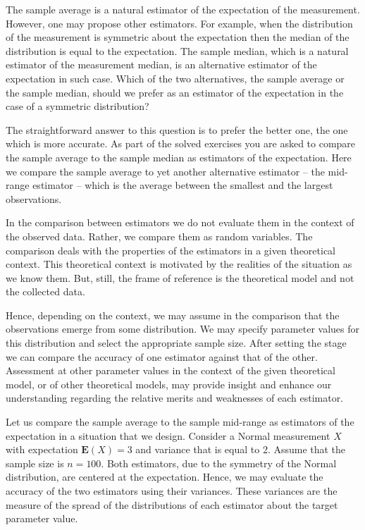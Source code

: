\documentclass[
]{krantz}
\newcommand{\Expec}{\mathbf{E}}
\theoremstyle{definition}
\theoremstyle{definition}
\theoremstyle{definition}
\theoremstyle{remark}
\begin{document}
The sample average is a natural estimator of the expectation of the
measurement. However, one may propose other estimators. For example,
when the distribution of the measurement is symmetric about the
expectation then the median of the distribution is equal to the
expectation. The sample median, which is a natural estimator of the
measurement median, is an alternative estimator of the expectation in
such case. Which of the two alternatives, the sample average or the
sample median, should we prefer as an estimator of the expectation in
the case of a symmetric distribution?

The straightforward answer to this question is to prefer the better one,
the one which is more accurate. As part of the solved exercises you are
asked to compare the sample average to the sample median as estimators
of the expectation. Here we compare the sample average to yet another
alternative estimator -- the mid-range estimator -- which is the average
between the smallest and the largest observations.

In the comparison between estimators we do not evaluate them in the
context of the observed data. Rather, we compare them as random
variables. The comparison deals with the properties of the estimators in
a given theoretical context. This theoretical context is motivated by
the realities of the situation as we know them. But, still, the frame of
reference is the theoretical model and not the collected data.

Hence, depending on the context, we may assume in the comparison that
the observations emerge from some distribution. We may specify parameter
values for this distribution and select the appropriate sample size.
After setting the stage we can compare the accuracy of one estimator
against that of the other. Assessment at other parameter values in the
context of the given theoretical model, or of other theoretical models,
may provide insight and enhance our understanding regarding the relative
merits and weaknesses of each estimator.

Let us compare the sample average to the sample mid-range as estimators
of the expectation in a situation that we design. Consider a Normal
measurement \(X\) with expectation \(\Expec(X) = 3\) and variance that is
equal to 2. Assume that the sample size is \(n = 100\). Both estimators,
due to the symmetry of the Normal distribution, are centered at the
expectation. Hence, we may evaluate the accuracy of the two estimators
using their variances. These variances are the measure of the spread of
the distributions of each estimator about the target parameter value.
\end{document}
